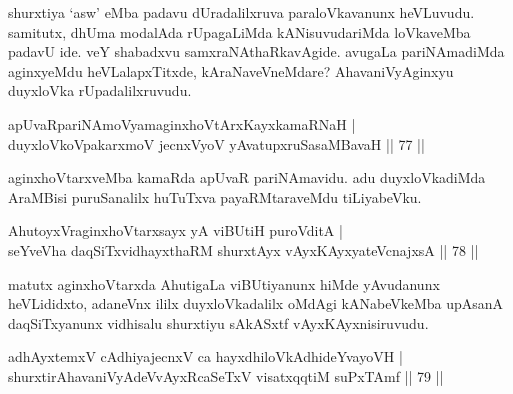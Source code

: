 \begin{artha}
shurxtiya `asw' eMba padavu dUradalilxruva paraloVkavanunx heVLuvudu. 
samitutx, dhUma modalAda rUpagaLiMda kANisuvudariMda loVkaveMba padavU 
ide. veY shabadxvu samxraNAthaRkavAgide. avugaLa pariNAmadiMda 
aginxyeMdu heVLalapxTitxde, kAraNaveVneMdare? AhavaniVyAginxyu 
duyxloVka rUpadalilxruvudu.
\end{artha}


\begin{shl}
apUvaRpariNAmoV\s yamaginxhoVtArxKayxkamaRNaH | \\
duyxloVkoVpakarxmoV jecnxVyoV yAvatupxruSasaMBavaH \hfill|| 77 || 
\end{shl}

\begin{artha}
aginxhoVtarxveMba kamaRda apUvaR pariNAmavidu. adu duyxloVkadiMda 
AraMBisi puruSanalilx huTuTxva payaRMtaraveMdu tiLiyabeVku.
\end{artha}


\begin{shl}
AhutoyxVraginxhoVtarxsayx yA viBUtiH puroVditA | \\
seYveVha daqSiTxvidhayxthaRM shurxtAyx vAyxKAyxyateV\s cnajxsA \hfill|| 78 || 
\end{shl}

\begin{artha}
matutx aginxhoVtarxda AhutigaLa viBUtiyanunx hiMde yAvudanunx \-heVLididxto, adaneVnx ililx duyxloVkadalilx oMdAgi kANabeVkeMba upAsanA daqSiTxyanunx vidhisalu shurxtiyu sAkASxtf vAyxKAyxnisiruvudu.
\end{artha}

\begin{shl}
adhAyxtemxV cAdhiyajecnxV ca hayxdhiloVkAdhideYvayoVH | \\
shurxtirAhavaniVyAdeVvAyxRcaSeTxV visatxqqtiM suPxTAmf \hfill|| 79 || 
\end{shl}

